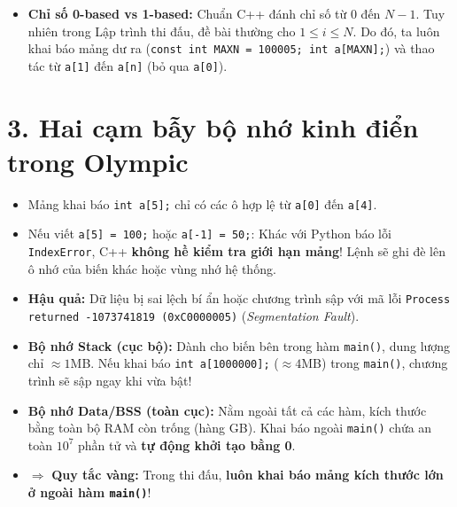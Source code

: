 \documentclass[11pt,a4paper]{article}
\begin{document}
\vspace{-0.15cm}
\begin{itemize}
    \setlength{\itemsep}{1pt}
    \footnotesize
    \item \textbf{Chỉ số 0-based vs 1-based:} Chuẩn C++ đánh chỉ số từ $0$ đến $N - 1$. Tuy nhiên trong Lập trình thi đấu, đề bài thường cho $1 \le i \le N$. Do đó, ta luôn khai báo mảng dư ra (\texttt{const int MAXN = 100005; int a[MAXN];}) và thao tác từ \texttt{a[1]} đến \texttt{a[n]} (bỏ qua \texttt{a[0]}).
\end{itemize}

\newpage
\section*{\color{AsianDarkBlue}\normalsize 3. Hai cạm bẫy bộ nhớ kinh điển trong Olympic}

\begin{tcolorbox}[colback=red!5!white,colframe=red!75!black,arc=1.5mm,title=\textbf{\small CẠM BẪY 1: TRUY XUẤT NGOÀI BIÊN MẢNG (OUT OF BOUNDS)}]
\footnotesize
\begin{itemize}
    \setlength{\itemsep}{1pt}
    \item Mảng khai báo \texttt{int a[5];} chỉ có các ô hợp lệ từ \texttt{a[0]} đến \texttt{a[4]}.
    \item Nếu viết \texttt{a[5] = 100;} hoặc \texttt{a[-1] = 50;}: Khác với Python báo lỗi \texttt{IndexError}, C++ \textbf{không hề kiểm tra giới hạn mảng}! Lệnh sẽ ghi đè lên ô nhớ của biến khác hoặc vùng nhớ hệ thống.
    \item \textbf{Hậu quả:} Dữ liệu bị sai lệch bí ẩn hoặc chương trình sập với mã lỗi \texttt{Process returned -1073741819 (0xC0000005)} (\textit{Segmentation Fault}).
\end{itemize}
\end{tcolorbox}

\vspace{-0.15cm}
\begin{tcolorbox}[colback=red!5!white,colframe=red!75!black,arc=1.5mm,title=\textbf{\small CẠM BẪY 2: TRÀN BỘ NHỚ NGĂN XẾP (STACK OVERFLOW)}]
\footnotesize
\begin{itemize}
    \setlength{\itemsep}{1pt}
    \item \textbf{Bộ nhớ Stack (cục bộ):} Dành cho biến bên trong hàm \texttt{main()}, dung lượng chỉ $\approx 1$MB. Nếu khai báo \texttt{int a[1000000];} ($\approx 4$MB) trong \texttt{main()}, chương trình sẽ sập ngay khi vừa bật!
    \item \textbf{Bộ nhớ Data/BSS (toàn cục):} Nằm ngoài tất cả các hàm, kích thước bằng toàn bộ RAM còn trống (hàng GB). Khai báo ngoài \texttt{main()} chứa an toàn $10^7$ phần tử và \textbf{tự động khởi tạo bằng 0}.
    \item $\Longrightarrow$ \textbf{Quy tắc vàng:} Trong thi đấu, \textbf{luôn khai báo mảng kích thước lớn ở ngoài hàm \texttt{main()}}!
\end{itemize}
\end{tcolorbox}
\end{document}
